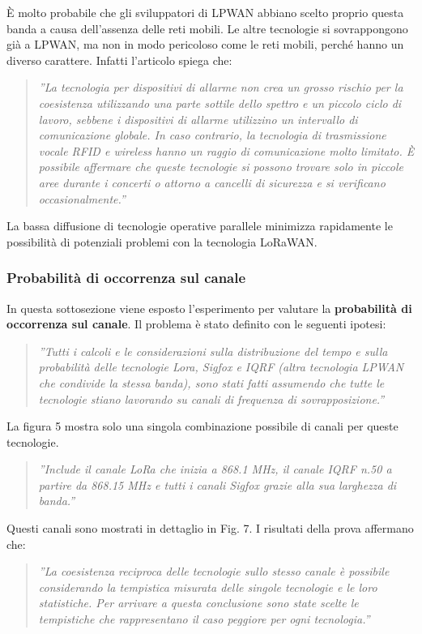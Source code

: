 \documentclass[a4paper]{report} %
\begin{document}
È molto probabile che gli sviluppatori di LPWAN abbiano scelto proprio questa banda a causa dell'assenza delle reti mobili. Le altre tecnologie si sovrappongono già a LPWAN, ma non in modo pericoloso come le reti mobili, perché hanno un diverso carattere. Infatti l'articolo \cite{art:rif.46} spiega che:
\begin{quote}
	\textit{''La tecnologia per dispositivi di allarme non crea un grosso rischio per la coesistenza utilizzando una parte sottile dello spettro e un piccolo ciclo di lavoro, sebbene i dispositivi di allarme utilizzino un intervallo di comunicazione globale. In caso contrario, la tecnologia di trasmissione vocale RFID e wireless hanno un raggio di comunicazione molto limitato. È possibile affermare che queste tecnologie si possono trovare solo in piccole aree durante i concerti o attorno a cancelli di sicurezza e si verificano occasionalmente.''}
\end{quote}
La bassa diffusione di tecnologie operative parallele minimizza rapidamente le possibilità di potenziali problemi con la tecnologia LoRaWAN.

\subsubsection{Probabilità di occorrenza sul canale}
In questa sottosezione viene esposto l'esperimento \cite{art:rif.46} per valutare la \textbf{probabilità di occorrenza sul canale}. Il problema è stato definito con le seguenti ipotesi:
\begin{quote}
	\textit{''Tutti i calcoli e le considerazioni sulla distribuzione del tempo e sulla probabilità delle tecnologie Lora, Sigfox e IQRF (altra tecnologia LPWAN che condivide la stessa banda), sono stati fatti assumendo che tutte le tecnologie stiano lavorando su canali di frequenza di sovrapposizione.''}
\end{quote}
La figura 5 mostra solo una singola combinazione possibile di canali per queste tecnologie. 
\begin{quote}
	\textit{''Include il canale LoRa che inizia a 868.1 MHz, il canale IQRF n.50 a partire da 868.15 MHz e tutti i canali Sigfox grazie alla sua larghezza di banda.''}
\end{quote}
Questi canali sono mostrati in dettaglio in Fig. 7. I risultati della prova affermano che:
\begin{quote}
	\textit{''La coesistenza reciproca delle tecnologie sullo stesso canale è possibile considerando la tempistica misurata delle singole tecnologie e le loro statistiche. Per arrivare a questa conclusione sono state scelte le tempistiche che rappresentano il caso peggiore per ogni tecnologia.''}
\end{quote}
\end{document}
